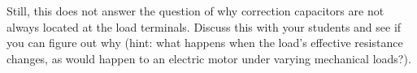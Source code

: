 Still, this does not answer the question of why correction capacitors are not always located at the load terminals.  Discuss this with your students and see if you can figure out why (hint: what happens when the load's effective resistance changes, as would happen to an electric motor under varying mechanical loads?).




